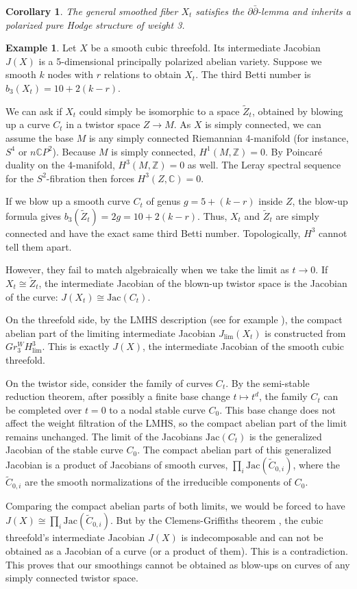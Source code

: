 \documentclass[11pt]{article}
\newtheorem{cor}[thm]{Corollary}
\theoremstyle{definition}
\newtheorem{ex}[thm]{Example}
\newcommand{\C}{\mathbb{C}}
\newcommand{\Z}{\mathbb{Z}}
\begin{document}
\begin{cor}
The general smoothed fiber $X_t$ satisfies the $\partial\bar{\partial}$-lemma and inherits a polarized pure Hodge structure of weight 3.
\end{cor}

\begin{ex}
Let $X$ be a smooth cubic threefold. Its intermediate Jacobian $J(X)$ is a 5-dimensional principally polarized abelian variety. Suppose we smooth $k$ nodes with $r$ relations to obtain $X_t$. The third Betti number is $b_3(X_t) = 10 + 2(k-r)$.

We can ask if $X_t$ could simply be isomorphic to a space $\tilde{Z}_t$, obtained by blowing up a curve $C_t$ in a twistor space $Z \to M$. As $X$ is simply connected, we can assume the base $M$ is any simply connected Riemannian 4-manifold (for instance, $S^4$ or $n\C P^2$). Because $M$ is simply connected, $H^1(M, \Z) = 0$. By Poincar\'e duality on the 4-manifold, $H^3(M, \Z) = 0$ as well. The Leray spectral sequence for the $S^2$-fibration then forces $H^3(Z, \C) = 0$.

If we blow up a smooth curve $C_t$ of genus $g = 5 + (k-r)$ inside $Z$, the blow-up formula gives $b_3(\tilde{Z}_t) = 2g = 10 + 2(k-r)$. Thus, $X_t$ and $\tilde{Z}_t$ are simply connected and have the exact same third Betti number. Topologically, $H^3$ cannot tell them apart.

However, they fail to match algebraically when we take the limit as $t \to 0$. If $X_t \cong \tilde{Z}_t$, the intermediate Jacobian of the blown-up twistor space is the Jacobian of the curve: $J(X_t) \cong \text{Jac}(C_t)$. 

On the threefold side, by the LMHS description (see for example \cite{F19}), the compact abelian part of the limiting intermediate Jacobian $J_{\text{lim}}(X_t)$ is constructed from $Gr^W_3 H^3_{\text{lim}}$. This is exactly $J(X)$, the intermediate Jacobian of the smooth cubic threefold.

On the twistor side, consider the family of curves $C_t$. By the semi-stable reduction theorem, after possibly a finite base change $t \mapsto t^d$, the family $C_t$ can be completed over $t=0$ to a nodal stable curve $C_0$. This base change does not affect the weight filtration of the LMHS, so the compact abelian part of the limit remains unchanged. The limit of the Jacobians $\text{Jac}(C_t)$ is the generalized Jacobian of the stable curve $C_0$. The compact abelian part of this generalized Jacobian is a product of Jacobians of smooth curves, $\prod_i \text{Jac}(\tilde{C}_{0, i})$, where the $\tilde{C}_{0, i}$ are the smooth normalizations of the irreducible components of $C_0$. 

Comparing the compact abelian parts of both limits, we would be forced to have $J(X) \cong \prod_i \text{Jac}(\tilde{C}_{0, i})$. But by the Clemens-Griffiths theorem \cite{CG72}, the cubic threefold's intermediate Jacobian $J(X)$ is indecomposable and can not be obtained as a Jacobian of a curve (or a product of them). This is a contradiction. This proves that our smoothings cannot be obtained as blow-ups on curves of any simply connected twistor space.
\end{ex}








\end{document}
